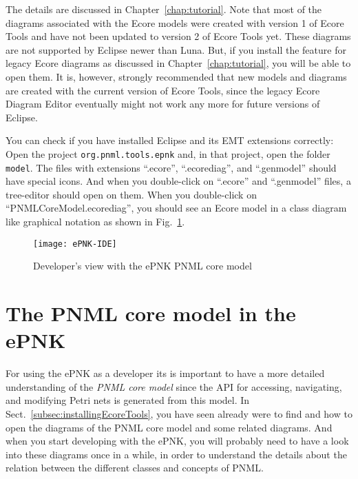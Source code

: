 The details are discussed in Chapter~\ref{chap:tutorial}. Note that most of
the diagrams associated with the Ecore models were created with version 1 of
Ecore Tools and have not been updated to version 2 of Ecore Tools yet. These
diagrams are not supported by Eclipse newer than Luna. But, if you install
the feature for legacy Ecore diagrams as discussed in Chapter~\ref{chap:tutorial},
you will be able to open them. It is, however, strongly recommended that
new models and diagrams are created with the current version of Ecore Tools,
since the legacy Ecore Diagram Editor eventually might not work any more for
future versions of Eclipse. 

You can check if you have installed Eclipse and its EMT extensions correctly:
Open the project {\tt org.pnml.tools.epnk} and, in that project, open the folder
{\tt model}. The files with extensions ``.ecore'', ``.ecorediag'', and ``.genmodel''
should have special icons. And when you double-click on ``.ecore'' and
``.genmodel'' files, a tree-editor should open on them. When you double-click
on ``PNMLCoreModel.ecorediag'', you should see an Ecore model in a class diagram
like graphical notation as shown in Fig.~\ref{fig:ePNK-IDE}. 

\begin{figure}[hbt!!]
  \centerline{\texttt{[image: ePNK-IDE]}}
  \caption{Developer's view with the ePNK PNML core model}
  \label{fig:ePNK-IDE}
\end{figure}


\section{The PNML core model in the ePNK}
\label{sec:ePNK-PNMLCoreModel}

For using the ePNK as a developer its is important to have a more
detailed understanding of the \emph{PNML core model} since the API
for accessing, navigating, and modifying Petri nets is generated
from this model.  In Sect.~\ref{subsec:installingEcoreTools}, you have seen
already were to find and how to open the diagrams of the PNML core model
and some related diagrams. And when you start developing with the
ePNK, you will probably need to have a look into these diagrams
once in a while, in order to understand the details about the relation
between the different classes and concepts of PNML. 

